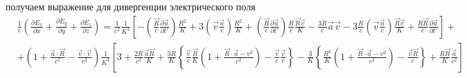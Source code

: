 \documentclass[11pt]{article}
\begin{document}
получаем выражение для дивергенции электрического поля \[\begin{align}
  & \frac{1}{e}\left( \frac{\partial {{E}_{x}}}{\partial x}+\frac{\partial {{E}_{y}}}{\partial y}+\frac{\partial {{E}_{z}}}{\partial z} \right)=\frac{1}{{{c}^{2}}}\frac{1}{{{K}^{3}}}\left[ -\left( \frac{\overrightarrow{R}}{c}\frac{\partial \overrightarrow{a}}{\partial t'} \right)\frac{{{R}^{2}}}{K}+3\left( \overrightarrow{v}\frac{\overrightarrow{a}}{c} \right)\frac{{{R}^{2}}}{K}+\left( \frac{\overrightarrow{R}}{c}\frac{\partial \overrightarrow{a}}{\partial t'} \right)\frac{R}{c}\frac{\overrightarrow{R}\overrightarrow{v}}{K}-\frac{3R}{c}\overrightarrow{a}\overrightarrow{v}-3\frac{R}{c}\left( \overrightarrow{v}\frac{\overrightarrow{a}}{c} \right)\frac{\overrightarrow{R}\overrightarrow{v}}{K}+\frac{R\overrightarrow{R}}{c}\frac{\partial \overrightarrow{a}}{\partial t'} \right]+ \\ 
 & +\left( 1+\frac{\overrightarrow{a}\cdot \overrightarrow{R}}{{{c}^{2}}}-\frac{\overrightarrow{v}\cdot \overrightarrow{v}}{{{c}^{2}}} \right)\frac{1}{{{K}^{3}}}\left[ 3+\frac{2R}{{{c}^{2}}}\frac{\overrightarrow{a}\overrightarrow{R}}{K}+\frac{3R}{K}\left\{ \frac{\overrightarrow{v}}{c}\frac{\overrightarrow{R}}{K}\left( 1+\frac{\overrightarrow{R}\cdot \overrightarrow{a}-{{v}^{2}}}{{{c}^{2}}} \right)-\frac{\overrightarrow{v}}{c}\frac{\overrightarrow{v}}{c} \right\}-\frac{3}{K}\left\{ \frac{{{R}^{2}}}{K}\left( 1+\frac{\overrightarrow{R}\cdot \overrightarrow{a}-{{v}^{2}}}{{{c}^{2}}} \right)-\frac{\overrightarrow{v}\overrightarrow{R}}{c} \right\}+\frac{R\overrightarrow{R}}{K}\frac{\overrightarrow{a}}{{{c}^{2}}} \right] \\ 
 &  \\ 
\end{align}\]
\end{document}
